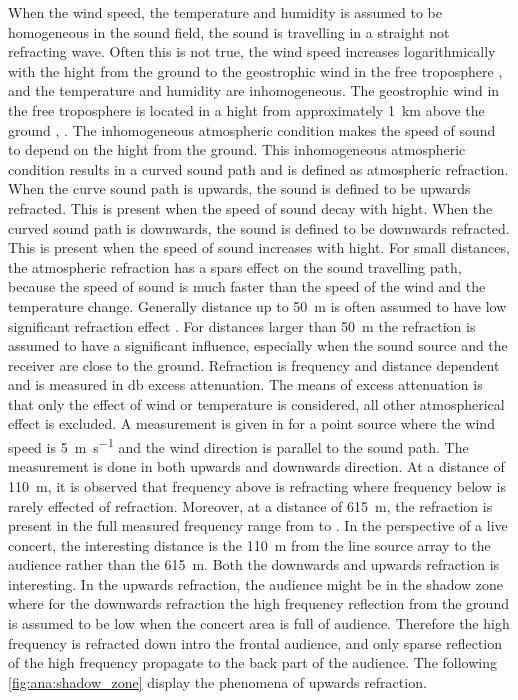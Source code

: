When the wind speed, the temperature and humidity is assumed to be homogeneous in the sound field, the sound is travelling in a straight not refracting wave. Often this is not true, the wind speed increases logarithmically with the hight from the ground to the geostrophic wind \citep{asmos_acous_2016} in the free troposphere \citep{spr_hand_book}, and the temperature and humidity are inhomogeneous. The geostrophic wind in the free troposphere is located in a hight from approximately \SI{1}{\kilo\meter} above the ground \citep{spr_hand_book}, \citep{geostrophic_wind}. The inhomogeneous atmospheric condition makes the speed of sound to depend on the hight from the ground. This inhomogeneous atmospheric condition results in a curved sound path and is defined as atmospheric refraction. When the curve sound path is upwards, the sound is defined to be upwards refracted. This is present when the speed of sound decay with hight. When the curved sound path is downwards, the sound is defined to be downwards refracted. This is present when the speed of sound increases with hight. For small distances, the atmospheric refraction has a spars effect on the sound travelling path, because the speed of sound is much faster than the speed of the wind and the temperature change. Generally distance up to \SI{50}{\meter} is often assumed to have low significant refraction effect \citep{effect_of_wind}. For distances larger than \SI{50}{\meter} the refraction is assumed to have a significant influence, especially when the sound source and the receiver are close to the ground. Refraction is frequency and distance dependent and is measured in \si{\decibel} excess attenuation. The means of excess attenuation is that only the effect of wind or temperature is considered, all other atmospherical effect is excluded. A measurement is given in \citep{review_of_sound} for a point source where the wind speed is \SI{5}{\meter\per\second} and the wind direction is parallel to the sound path. The measurement is done in both upwards and downwards direction. At a distance of \SI{110}{\meter}, it is observed that frequency above  is refracting where frequency below is rarely effected of refraction. Moreover, at a distance of \SI{615}{\meter}, the refraction is present in the full measured frequency range from  to . In the perspective of a live concert, the interesting distance is the \SI{110}{\meter} from the line source array to the audience rather than the \SI{615}{\meter}. Both the downwards and upwards refraction is interesting. In the upwards refraction, the audience might be in the shadow zone where for the downwards refraction the high frequency reflection from the ground is assumed to be low when the concert area is full of audience. Therefore the high frequency is refracted down intro the frontal audience, and only sparse reflection of the high frequency propagate to the back part of the audience. The following \autoref{fig:ana:shadow_zone} display the phenomena of upwards refraction.


